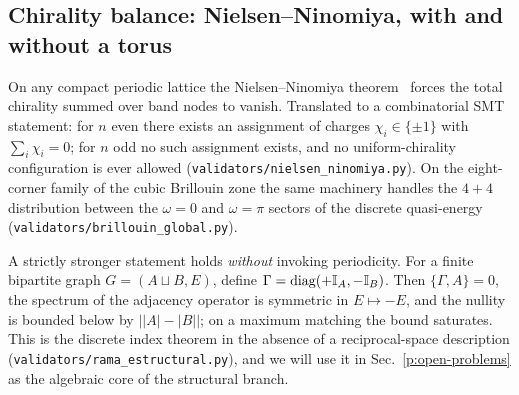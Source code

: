 \subsection{Chirality balance: Nielsen--Ninomiya, with and without a torus}
On any compact periodic lattice the Nielsen--Ninomiya
theorem~\cite{NielsenNinomiya1981a,NielsenNinomiya1981b} forces the
total chirality summed over band nodes to vanish. Translated to a
combinatorial SMT statement: for $n$ even there exists an assignment of
charges $\chi_{i}\in\{\pm 1\}$ with $\sum_{i}\chi_{i}=0$; for $n$ odd no
such assignment exists, and no uniform-chirality configuration is ever
allowed (\texttt{validators/nielsen\_ninomiya.py}). On the eight-corner
family of the cubic Brillouin zone the same machinery handles the
$4{+}4$ distribution between the $\omega=0$ and $\omega=\pi$ sectors
of the discrete quasi-energy
(\texttt{validators/brillouin\_global.py}).

A strictly stronger statement holds \emph{without} invoking periodicity.
For a finite bipartite graph $G=(A\sqcup B,E)$, define
$\Gamma=\mathrm{diag}(+\mathbb{I}_{A},-\mathbb{I}_{B})$. Then
$\{\Gamma, A\}=0$, the spectrum of the adjacency operator is symmetric
in $E\mapsto -E$, and the nullity is bounded below by
$\lvert\lvert A\rvert-\lvert B\rvert\rvert$; on a maximum matching the
bound saturates. This is the discrete index theorem in the absence of a
reciprocal-space description (\texttt{validators/rama\_estructural.py}),
and we will use it in Sec.~\ref{p:open-problems} as the algebraic core
of the structural branch.
